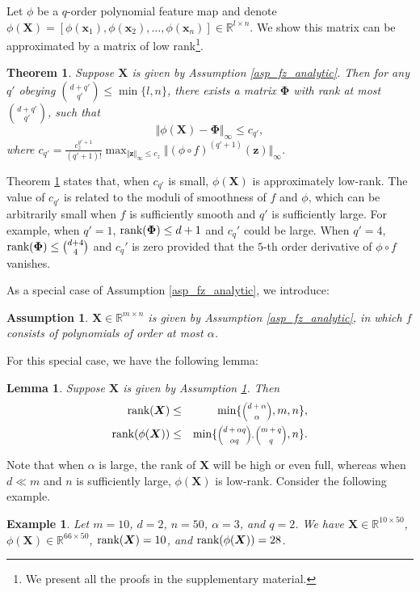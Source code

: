 \documentclass[letterpaper]{article} %
\newtheorem{theorem}{Theorem}
\newtheorem{lemma}{Lemma}
\newtheorem{assumption}{Assumption}
\newtheorem{example}{Example}
\begin{document}
Let $\phi$ be a $q$-order polynomial feature map and denote $\phi(\bm{X})=[\phi(\bm{x}_1),\phi(\bm{x}_2),\ldots,\phi(\bm{x}_n)]\in\mathbb{R}^{l\times n}$.
We show this matrix can be approximated by a matrix of low rank\footnote{We present all the proofs in the supplementary material.}.
\begin{theorem}\label{theo_rank_phi}
Suppose $\bm{X}$ is given by Assumption \ref{asp_fz_analytic}. Then for any $q'$ obeying $\binom{d+q'}{q'}\leq \min\lbrace l,n\rbrace$, there exists a matrix $\bm{\Phi}$ with rank at most $\binom{d+q'}{q'}$, such that
$$\Vert\phi(\bm{X})-\bm{\Phi}\Vert_{\infty}\leq c_{q'},$$
where $c_{q'}=\tfrac{c_z^{q'+1}}{(q'+1)!}\max_{\Vert \bm{z}\Vert_{\infty} \leq c_z}\Vert(\phi\circ f)^{(q'+1)}(\bm{z})\Vert_\infty$.
\end{theorem}
Theorem \ref{theo_rank_phi} states that,
when $c_{q'}$ is small, $\phi(\bm{X})$ is approximately low-rank.
The value of $c_{q'}$ is related to the moduli of smoothness of $f$ and $\phi$,
which can be arbitrarily small when $f$ is sufficiently smooth
and $q'$ is sufficiently large.
For example, when $q'=1$, $\textup{rank}(\bm{\Phi})\leq d+1$ and $c_q'$ could be large.
When $q'=4$, $\textup{rank}(\bm{\Phi})\leq \binom{d+4}{4}$ and $c_q'$ is zero provided that the $5$-th order derivative of $\phi\circ f$ vanishes.


As a special case of Assumption \ref{asp_fz_analytic}, we introduce:
\begin{assumption}\label{asp_fz_poly}
$\bm{X}\in\mathbb{R}^{m\times n}$ is given by Assumption \ref{asp_fz_analytic}, in which $f$ consists of polynomials of order at most $\alpha$.
\end{assumption}
\noindent

For this special case, we have the following lemma:
\begin{lemma}\label{theo_rank_phi_poly}
Suppose $\bm{X}$ is given by Assumption \ref{asp_fz_poly}. Then
\begin{eqnarray*}
  \textup{rank}(\bm{X})&\leq&\min\lbrace \scaleobj{0.7}{\binom{d+\alpha}{\alpha}},m,n\rbrace, \\
  \textup{rank}(\phi(\bm{X}))&\leq&\min\lbrace \scaleobj{0.7}{\binom{d+\alpha q}{\alpha q},\binom{m+q}{q}},n\rbrace.
\end{eqnarray*}
\end{lemma}


Note that when $\alpha$ is large, the rank of $\bm{X}$ will be high or even full,
whereas when  $d\ll m$ and $n$ is sufficiently large, $\phi(\bm{X})$ is  low-rank.
Consider the following example.
\begin{example}
Let $m=10$, $d=2$, $n=50$, $\alpha=3$, and $q=2$. We have $\bm{X}\in\mathbb{R}^{10\times 50}$, $\phi(\bm{X})\in\mathbb{R}^{66\times 50}$, $\textup{rank}(\bm{X})=10$, and $\textup{rank}(\phi(\bm{X}))=28$.
\end{example}
\end{document}
